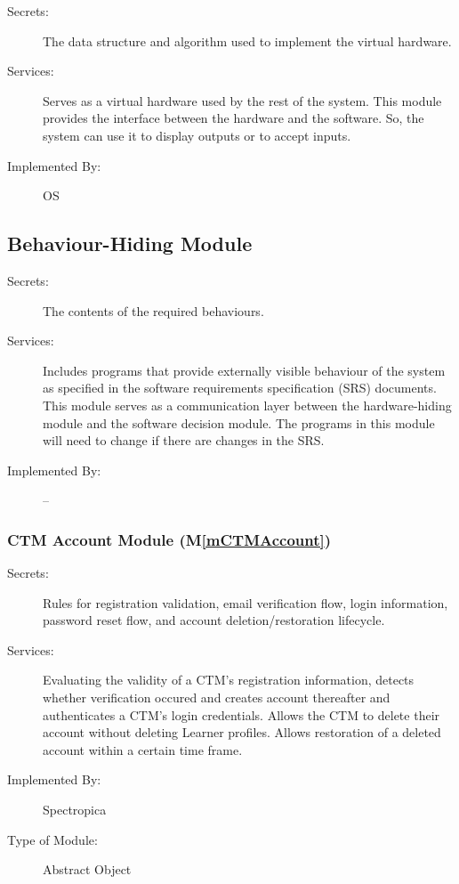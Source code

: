 \documentclass[12pt, titlepage]{article}
\newcommand{\mref}[1]{M\ref{#1}}
\begin{document}
\begin{description}
\item[Secrets:]The data structure and algorithm used to implement the virtual
  hardware.
\item[Services:]Serves as a virtual hardware used by the rest of the
  system. This module provides the interface between the hardware and the
  software. So, the system can use it to display outputs or to accept inputs.
\item[Implemented By:] OS
\end{description}

\subsection{Behaviour-Hiding Module}

\begin{description}
\item[Secrets:]The contents of the required behaviours.
\item[Services:]Includes programs that provide externally visible behaviour of
  the system as specified in the software requirements specification (SRS)
  documents. This module serves as a communication layer between the
  hardware-hiding module and the software decision module. The programs in this
  module will need to change if there are changes in the SRS.
\item[Implemented By:] --
\end{description}

\subsubsection{CTM Account Module (\mref{mCTMAccount})}

\begin{description}
\item[Secrets:] Rules for registration validation, email verification flow, login information, password reset flow, and account deletion/restoration lifecycle.
\item[Services:] Evaluating the validity of a CTM's registration information, detects whether verification occured and creates account thereafter and authenticates a CTM's login credentials. Allows the CTM to delete their account without deleting Learner profiles. Allows restoration of a deleted account within a certain time frame.
\item[Implemented By:] Spectropica
\item[Type of Module:] Abstract Object
\end{description}
\end{document}
